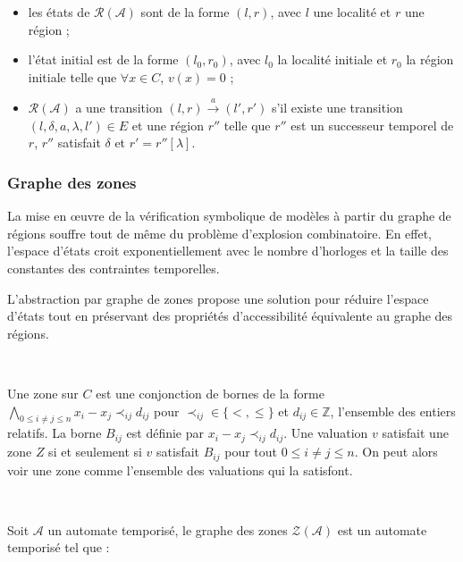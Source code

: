 \documentclass{article}
\begin{document}
        \begin{itemize}
          \item les états de $\mathcal{R}(\mathcal{A})$ sont de la forme
            $(l,r)$, avec $l$ une localité et $r$ une région ;
          \item l'état initial est de la forme $(l_0,r_0)$, avec $l_0$ la
            localité initiale et $r_0$ la région initiale telle que $\forall x
            \in C$, $v(x) = 0$ ;
          \item $\mathcal{R}(\mathcal{A})$ a une transition
            $(l,r)\xrightarrow{a}(l',r')$ s'il existe une transition
            $(l,\delta,a,\lambda,l') \in E$ et une région $r''$ telle que $r''$
            est un successeur temporel de $r$, $r''$ satisfait $\delta$ et $r' =
            r''[\lambda]$.
        \end{itemize}

      \subsubsection{Graphe des zones}
    
        La mise en \oe uvre de la vérification symbolique de modèles à partir du
        graphe de régions souffre tout de même du problème d'explosion
        combinatoire. En effet, l'espace d'états croit exponentiellement avec le
        nombre d'horloges et la taille des constantes des contraintes
        temporelles.
      
        L'abstraction par graphe de zones \cite{daws98} propose une solution
        pour réduire l'espace d'états tout en préservant des propriétés
        d'accessibilité équivalente au graphe des régions.
      
        ~

        Une zone sur $C$ est une conjonction de bornes de la forme $\bigwedge_{0
          \le i \neq j \le n} x_i - x_j \prec_{ij} d_{ij}$ pour $\prec_{ij} \in
        \{ <, \le \}$ et $d_{ij} \in \mathbb{Z}$, l'ensemble des entiers
        relatifs. La borne $B_{ij}$ est définie par $x_i - x_j \prec_{ij}
        d_{ij}$. Une valuation $v$ satisfait une zone $Z$ si et seulement si
        $v$ satisfait $B_{ij}$ pour tout $0 \le i \neq j \le n$. On peut alors
        voir une zone comme l'ensemble des valuations qui la satisfont.

        ~

        Soit $\mathcal{A}$ un automate temporisé, le graphe des zones
        $\mathcal{Z}(\mathcal{A})$ est un automate temporisé tel que :
      
\end{document}
